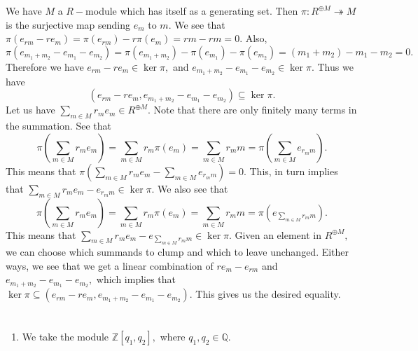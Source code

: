 \documentclass{article}
\begin{document}
\section{} %
We have $M$ a $R-$module which has itself as a generating set. Then $\pi: R^{\oplus M}\twoheadrightarrow M$ is the surjective map sending $e_m$ to $m.$ We 
see that $\pi(e_{rm}-re_m)=\pi(e_{rm})-r\pi(e_m)=rm-rm=0.$ Also, $\pi(e_{m_1+m_2}-e_{m_1}-e_{m_2})=\pi(e_{m_1+m_2})-\pi(e_{m_1})-\pi(e_{m_2})= 
(m_1+m_2)-m_1-m_2=0.$ Therefore we have $ e_{rm}-re_m \in \ker \pi, $ and $e_{m_1+m_2}-e_{m_1}-e_{m_2} \in \ker \pi.$ Thus we have 
$$(e_{rm}-re_m,e_{m_1+m_2}-e_{m_1}-e_{m_2}) \subseteq \ker \pi.$$ Let us have $\sum_{m \in M}r_m e_m \in R^{\oplus M}.$ Note that there are only finitely 
many 
terms in the summation. See that $$\pi(\sum_{m \in M}r_m e_m)=\sum_{m \in M}r_m \pi(e_m)= \sum_{m \in M}r_m m = \pi(\sum_{m \in M}e_{r_mm}).$$ This means 
that 
$\pi(\sum_{m \in M}r_m e_m - \sum_{m \in M}e_{r_mm})=0.$ This, in turn implies that $ \sum_{m \in M} r_me_m - e_{r_mm} \in \ker \pi.$ We also see that 
$$\pi(\sum_{m \in M}r_m e_m)=\sum_{m \in M}r_m \pi(e_m)= \sum_{m \in M}r_m m = \pi(e_{\sum_{m \in M}r_mm}).$$ This means that $\sum_{m \in M}r_m 
e_m-e_{\sum_{m \in M}r_mm} \in \ker \pi.$ Given an element in $R^{\oplus M},$ we can choose which summands to clump and which to leave unchanged. Either 
ways, we see that we get a linear combination of $re_m-e_{rm}$ and $e_{m_1+m_2}-e_{m_1}-e_{m_2},$ which implies that $ \ker \pi \subseteq 
(e_{rm}-re_m,e_{m_1+m_2}-e_{m_1}-e_{m_2}).$ This gives us the desired equality.
\section{} %
\begin{enumerate}
	\item We take the module $\mathbb{Z}[q_1,q_2],$ where $q_1,q_2 \in \mathbb{Q}.$ 
\end{enumerate}
\section{} %
\section{} %
\end{document}

